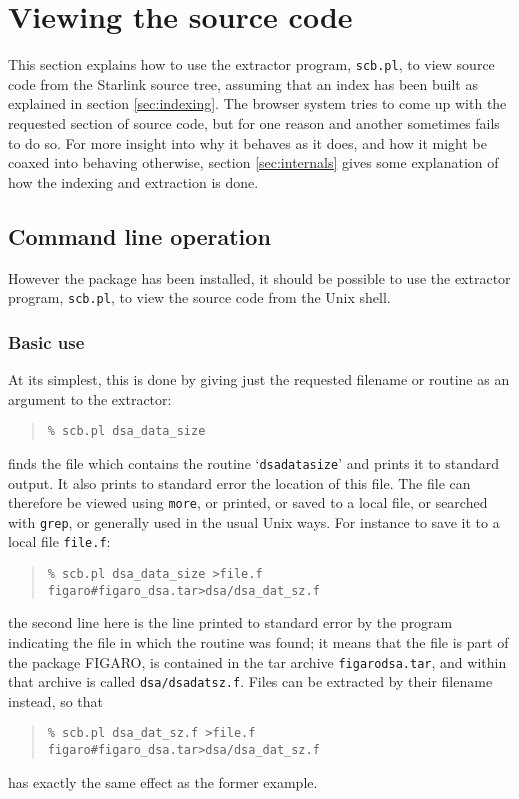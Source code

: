 \documentclass[twoside,11pt]{article}
\newcommand{\xlabel}[1]{}
\renewcommand{\_}{\texttt{\symbol{95}}}
\begin{document}
\section{Viewing the source code}

This section explains how to use the extractor program, {\tt scb.pl},
to view source code from the Starlink source tree,
assuming that an index has been built as explained in 
section \ref{sec:indexing}.
The browser system tries to come up with the requested section of
source code, but for one reason and another sometimes fails to 
do so.  
For more insight into why it behaves as it does, and 
how it might be coaxed into behaving otherwise, 
section \ref{sec:internals} gives some explanation of how the
indexing and extraction is done.


\subsection{\xlabel{sec:extract-commandline}Command line operation}

However the package has been installed, it should be 
possible to use the extractor program, {\tt scb.pl},
to view the source code from the Unix shell.

\subsubsection{Basic use}

At its simplest, this is done by giving just the 
requested filename or routine as an argument to the extractor:
\begin{quote}
\begin{verbatim}
% scb.pl dsa_data_size
\end{verbatim}
\end{quote}
finds the file which contains the routine `{\tt dsa\_data\_size}'
and prints it to standard output.  It also
prints to standard error the location of this file.
The file can therefore be viewed using {\tt more}, or printed,
or saved to a local file, or searched with {\tt grep}, or
generally used in the usual Unix ways.
For instance to save it to a local file {\tt file.f}:
\begin{quote}
\begin{verbatim}
% scb.pl dsa_data_size >file.f
figaro#figaro_dsa.tar>dsa/dsa_dat_sz.f
\end{verbatim}
\end{quote}
the second line here is the line printed to standard error 
by the program indicating the file in which the routine was found;
it means that the file is part of the package FIGARO,
is contained in the tar archive {\tt figaro\_dsa.tar}, and
within that archive is called {\tt dsa/dsa\_dat\_sz.f}.
Files can be extracted by their filename instead,
so that
\begin{quote}
\begin{verbatim}
% scb.pl dsa_dat_sz.f >file.f
figaro#figaro_dsa.tar>dsa/dsa_dat_sz.f
\end{verbatim}
\end{quote}
has exactly the same effect as the former example.
\end{document}
